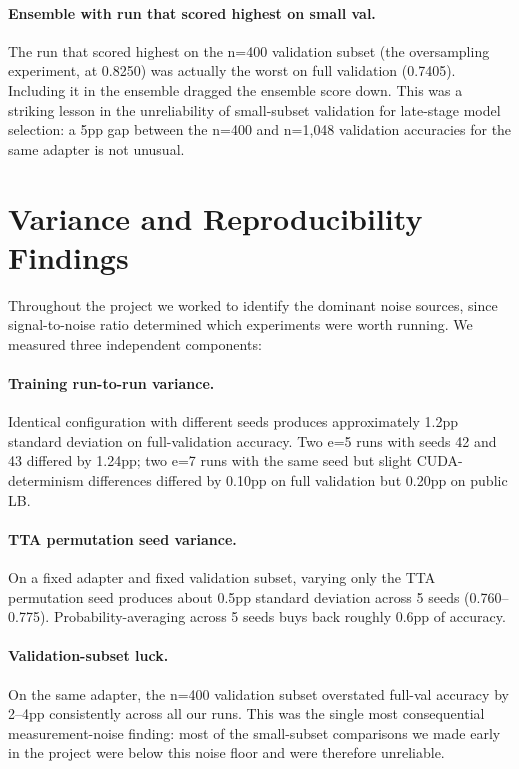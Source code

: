 \documentclass[11pt]{article}
\begin{document}
\paragraph{Ensemble with run that scored highest on small val.} The run that scored highest on the n=400 validation subset (the oversampling experiment, at 0.8250) was actually the worst on full validation (0.7405). Including it in the ensemble dragged the ensemble score down. This was a striking lesson in the unreliability of small-subset validation for late-stage model selection: a 5pp gap between the n=400 and n=1{,}048 validation accuracies for the same adapter is not unusual.

\section{Variance and Reproducibility Findings}

Throughout the project we worked to identify the dominant noise sources, since signal-to-noise ratio determined which experiments were worth running. We measured three independent components:

\paragraph{Training run-to-run variance.} Identical configuration with different seeds produces approximately 1.2pp standard deviation on full-validation accuracy. Two e=5 runs with seeds 42 and 43 differed by 1.24pp; two e=7 runs with the same seed but slight CUDA-determinism differences differed by 0.10pp on full validation but 0.20pp on public LB.

\paragraph{TTA permutation seed variance.} On a fixed adapter and fixed validation subset, varying only the TTA permutation seed produces about 0.5pp standard deviation across 5 seeds (0.760--0.775). Probability-averaging across 5 seeds buys back roughly 0.6pp of accuracy.

\paragraph{Validation-subset luck.} On the same adapter, the n=400 validation subset overstated full-val accuracy by 2--4pp consistently across all our runs. This was the single most consequential measurement-noise finding: most of the small-subset comparisons we made early in the project were below this noise floor and were therefore unreliable.
\end{document}
